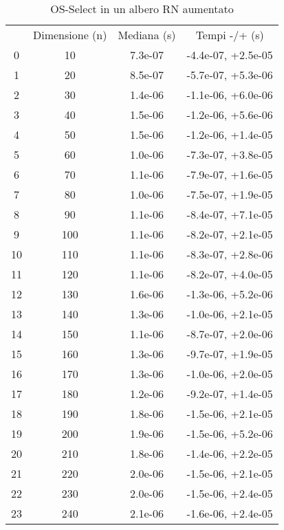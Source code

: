 \begin{table}
\centering
\caption{OS-Select in un albero RN aumentato}
\label{OS-Select in un albero RN aumentato}
\begin{adjustbox}{width=1\textwidth/2}
\begin{tabular}{|c|c|c|c|}
\hline
 & Dimensione (n) & Mediana (s) & Tempi -/+ (s) \\
0 & 10 & 7.3e-07 & -4.4e-07, +2.5e-05 \\
\cline{1-4}
1 & 20 & 8.5e-07 & -5.7e-07, +5.3e-06 \\
\cline{1-4}
2 & 30 & 1.4e-06 & -1.1e-06, +6.0e-06 \\
\cline{1-4}
3 & 40 & 1.5e-06 & -1.2e-06, +5.6e-06 \\
\cline{1-4}
4 & 50 & 1.5e-06 & -1.2e-06, +1.4e-05 \\
\cline{1-4}
5 & 60 & 1.0e-06 & -7.3e-07, +3.8e-05 \\
\cline{1-4}
6 & 70 & 1.1e-06 & -7.9e-07, +1.6e-05 \\
\cline{1-4}
7 & 80 & 1.0e-06 & -7.5e-07, +1.9e-05 \\
\cline{1-4}
8 & 90 & 1.1e-06 & -8.4e-07, +7.1e-05 \\
\cline{1-4}
9 & 100 & 1.1e-06 & -8.2e-07, +2.1e-05 \\
\cline{1-4}
10 & 110 & 1.1e-06 & -8.3e-07, +2.8e-06 \\
\cline{1-4}
11 & 120 & 1.1e-06 & -8.2e-07, +4.0e-05 \\
\cline{1-4}
12 & 130 & 1.6e-06 & -1.3e-06, +5.2e-06 \\
\cline{1-4}
13 & 140 & 1.3e-06 & -1.0e-06, +2.1e-05 \\
\cline{1-4}
14 & 150 & 1.1e-06 & -8.7e-07, +2.0e-06 \\
\cline{1-4}
15 & 160 & 1.3e-06 & -9.7e-07, +1.9e-05 \\
\cline{1-4}
16 & 170 & 1.3e-06 & -1.0e-06, +2.0e-05 \\
\cline{1-4}
17 & 180 & 1.2e-06 & -9.2e-07, +1.4e-05 \\
\cline{1-4}
18 & 190 & 1.8e-06 & -1.5e-06, +2.1e-05 \\
\cline{1-4}
19 & 200 & 1.9e-06 & -1.5e-06, +5.2e-06 \\
\cline{1-4}
20 & 210 & 1.8e-06 & -1.4e-06, +2.2e-05 \\
\cline{1-4}
21 & 220 & 2.0e-06 & -1.5e-06, +2.1e-05 \\
\cline{1-4}
22 & 230 & 2.0e-06 & -1.5e-06, +2.4e-05 \\
\cline{1-4}
23 & 240 & 2.1e-06 & -1.6e-06, +2.4e-05 \\

\end{tabular}
\end{adjustbox}
\end{table}
